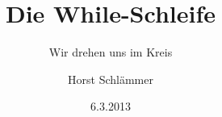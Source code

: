 \documentclass[
  showresults,
  edumath,
]{edu}
\author{Horst Schlämmer}
\date{6.3.2013}
\subtitle{Wir drehen uns im Kreis}
\title{Die While-Schleife}
\begin{document}
  \begin{preview}
    \begin{minipage}{\linewidth}
      
    \end{minipage}
  \end{preview}
  
\end{document}
